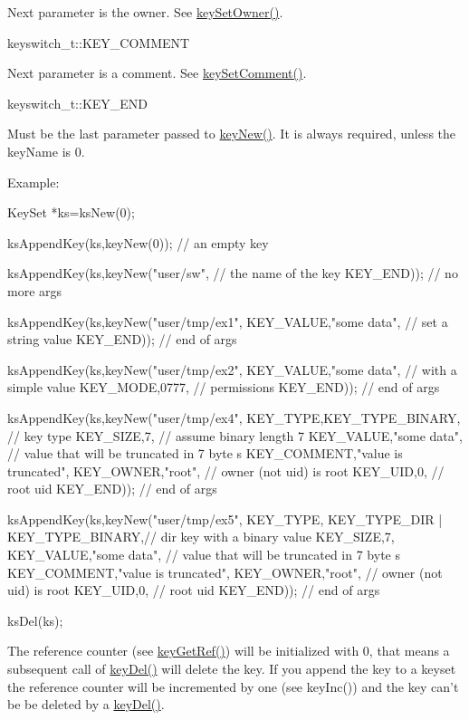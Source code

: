 \begin{DoxyItemize}
 Next parameter is the owner. See \hyperlink{group__keyname_ga88d6ec200ba0707b7c1b4a88133d2be4}{keySetOwner()}.
\item keyswitch\_\-t::KEY\_\-COMMENT \par
 Next parameter is a comment. See \hyperlink{group__keyvalue_ga8863a877a84fa46e6017fe72e49b89c1}{keySetComment()}.
\item keyswitch\_\-t::KEY\_\-END \par
 Must be the last parameter passed to \hyperlink{group__key_gaf6893c038b3ebee90c73a9ea8356bebf}{keyNew()}. It is always required, unless the {\ttfamily keyName} is 0.
\end{DoxyItemize}

\begin{DoxyParagraph}{Example:}

\begin{DoxyCode}
KeySet *ks=ksNew(0);

ksAppendKey(ks,keyNew(0));       // an empty key

ksAppendKey(ks,keyNew("user/sw",              // the name of the key
        KEY_END));                      // no more args

ksAppendKey(ks,keyNew("user/tmp/ex1",
        KEY_VALUE,"some data",          // set a string value
        KEY_END));                      // end of args

ksAppendKey(ks,keyNew("user/tmp/ex2",
        KEY_VALUE,"some data",          // with a simple value
        KEY_MODE,0777,                  // permissions
        KEY_END));                      // end of args

ksAppendKey(ks,keyNew("user/tmp/ex4",
        KEY_TYPE,KEY_TYPE_BINARY,       // key type
        KEY_SIZE,7,                     // assume binary length 7
        KEY_VALUE,"some data",          // value that will be truncated in 7 byte
      s
        KEY_COMMENT,"value is truncated",
        KEY_OWNER,"root",               // owner (not uid) is root
        KEY_UID,0,                      // root uid
        KEY_END));                      // end of args

ksAppendKey(ks,keyNew("user/tmp/ex5",
        KEY_TYPE,
                KEY_TYPE_DIR | KEY_TYPE_BINARY,// dir key with a binary value
        KEY_SIZE,7,
        KEY_VALUE,"some data",          // value that will be truncated in 7 byte
      s
        KEY_COMMENT,"value is truncated",
        KEY_OWNER,"root",               // owner (not uid) is root
        KEY_UID,0,                      // root uid
        KEY_END));                      // end of args

ksDel(ks);
\end{DoxyCode}

\end{DoxyParagraph}
The reference counter (see \hyperlink{group__key_ga4aabc4272506dd63161db2bbb42de8ae}{keyGetRef()}) will be initialized with 0, that means a subsequent call of \hyperlink{group__key_ga3df95bbc2494e3e6703ece5639be5bb1}{keyDel()} will delete the key. If you append the key to a keyset the reference counter will be incremented by one (see keyInc()) and the key can't be be deleted by a \hyperlink{group__key_ga3df95bbc2494e3e6703ece5639be5bb1}{keyDel()}.


